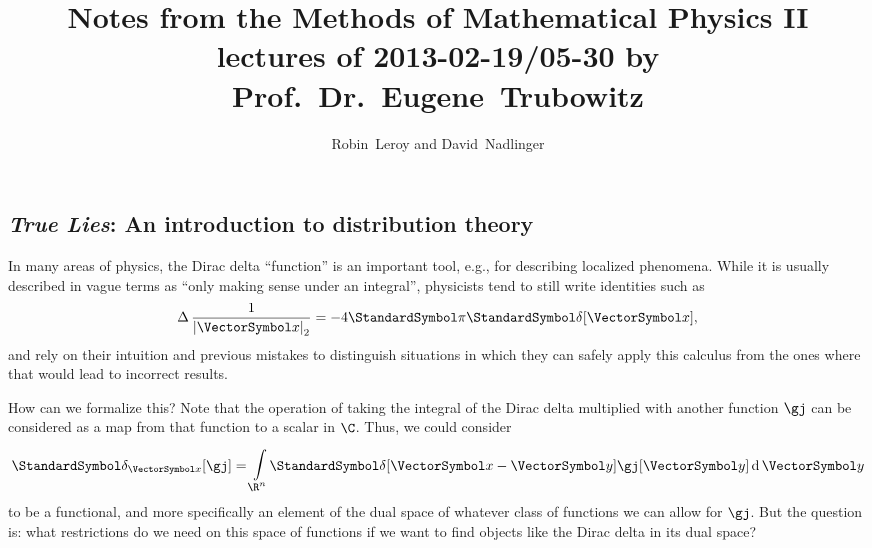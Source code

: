 \documentclass[10pt, a4paper, twoside]{lecturenotes}
\title{Notes from the Methods of Mathematical Physics II lectures of 2013-02-19{\slash}05-30 by Prof.~Dr.~Eugene~Trubowitz}
\author{Robin~Leroy and David~Nadlinger}
\newcommand{\Rn}{{\R^n}}
\begin{document}
  \maketitle
  
  \setcounter{Lecture}{3}  
  
  \begin{lecture}[date={2013-02-28}]
  \section{\emph{True Lies}: An introduction to distribution theory}
  In many areas of physics, the Dirac delta ``function'' is an important tool, e.g., for describing localized phenomena. While it is usually described in vague terms as ``only making sense under an integral'', physicists tend to still write identities such as
  \begin{equation*}
    \Laplacian\frac{1}{\norm{\vx}} = -4 \Pi \DiracDelta\of\vx\text{,}
  \end{equation*}
  and rely on their intuition and previous mistakes to distinguish situations in which they can safely apply this calculus from the ones where that would lead to incorrect results.

  How can we formalize this? Note that the operation of taking the integral of the Dirac delta multiplied with another function $\gj$ can be considered as a map from that function to a scalar in $\C$. Thus, we could consider
  \begin{equation*}
    \DiracDelta[\vx]\of\gj = \int\Rn \DiracDelta\of{\vx - \vy} \gj\of\vy \diffd\vy
  \end{equation*}
  to be a functional, and more specifically an element of the dual space of whatever class of functions we can allow for $\gj$. But the question is: what restrictions do we need on this space of functions if we want to find objects like the Dirac delta in its dual space?
  

\end{lecture}
\end{document}

